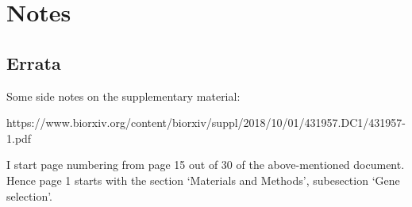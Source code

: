 \documentclass[12pt]{article}
\begin{document}
\section{Notes}
\subsection{Errata}
Some side notes on the supplementary material:

 \hspace*{-35pt}
\begin{small}
https://www.biorxiv.org/content/biorxiv/suppl/2018/10/01/431957.DC1/431957-1.pdf
\end{small}
I start page numbering from page 15 out of 30 of the above-mentioned document. Hence page 1 starts with the section `Materials and Methods', subesection `Gene selection'.
\end{document}
